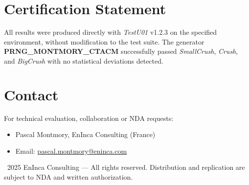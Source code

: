 \documentclass[11pt]{article}
\begin{document}
\section{Certification Statement}
All results were produced directly with \textit{TestU01} v1.2.3 on the specified environment, without modification to the test suite. The generator \textbf{PRNG\_MONTMORY\_CTACM} successfully passed \textit{SmallCrush}, \textit{Crush}, and \textit{BigCrush} with no statistical deviations detected.

\section{Contact}
For technical evaluation, collaboration or NDA requests:
\begin{itemize}
  \item Pascal Montmory, EnInca Consulting (France)
  \item Email: \href{mailto:pascal.montmory@eninca.com}{pascal.montmory@eninca.com}
\end{itemize}

\vfill
\noindent\footnotesize{\textcopyright~2025 EnInca Consulting --- All rights reserved. Distribution and replication are subject to NDA and written authorization.}
\end{document}
